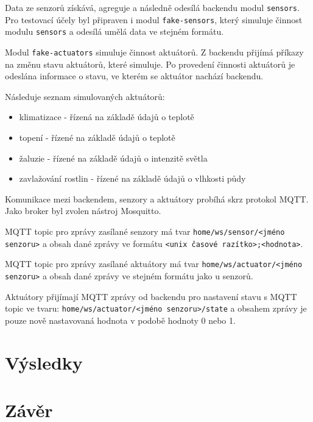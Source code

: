 \documentclass[11pt,a4paper]{article}
\begin{document}
Data ze senzorů získává, agreguje a následně odesílá backendu modul \texttt{sensors}.
Pro testovací účely byl připraven i modul \texttt{fake-sensors}, který simuluje
činnost modulu \texttt{sensors} a odesílá umělá data ve stejném formátu.

Modul \texttt{fake-actuators} simuluje činnost aktuátorů.
Z backendu přijímá příkazy na změnu stavu aktuátorů, které simuluje.
Po provedení činnosti aktuátorů je odeslána informace o stavu, ve kterém
se aktuátor nachází backendu.

Následuje seznam simulovaných aktuátorů:
\begin{itemize}
    \item klimatizace - řízená na základě údajů o teplotě
    \item topení - řízené na základě údajů o teplotě
    \item žaluzie - řízené na základě údajů o intenzitě světla
    \item zavlažování rostlin - řízené na základě údajů o vlhkosti půdy
\end{itemize}

Komunikace mezi backendem, senzory a aktuátory probíhá skrz protokol MQTT. Jako broker byl zvolen nástroj Mosquitto.

MQTT topic pro zprávy zasílané senzory má tvar \texttt{home/ws/sensor/<jméno senzoru>} a obsah dané zprávy ve formátu \texttt{<unix časové razítko>;<hodnota>}.

MQTT topic pro zprávy zasílané aktuátory má tvar \texttt{home/ws/actuator/<jméno senzoru>} a obsah dané zprávy ve stejném formátu jako u senzorů.

Aktuátory přijímají MQTT zprávy od backendu pro nastavení stavu s MQTT topic ve tvaru: \texttt{home/ws/actuator/<jméno senzoru>/state} a obsahem zprávy je pouze nově nastavovaná hodnota v podobě hodnoty 0 nebo 1.

\section{Výsledky}\label{sec:res}


\section{Závěr}\label{sec:sum}
\end{document}
